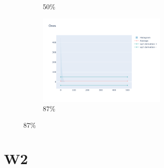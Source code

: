 \documentclass[12pt, fleqn]{report}                             %
\theoremstyle{break}                                            %
\begin{document}
\begin{figure}[h!]
\begin{subfigure}[b]{0.4\linewidth}
            \caption{50\%}
          \end{subfigure}
          \begin{subfigure}[b]{0.4\linewidth}
            \includegraphics[width=0.7\textwidth]{Images/160/dia-d.png}
            \caption{87\%}
          \end{subfigure}
        \end{figure}


      \section{W2}
              
\end{document}

